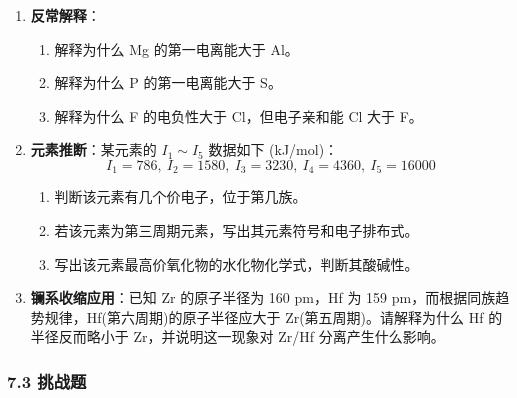 \begin{enumerate}
\def\labelenumi{\arabic{enumi}.}
\setcounter{enumi}{3}
\tightlist
\item
  \textbf{反常解释}：

  \begin{enumerate}
  \def\labelenumii{(\arabic{enumii})}
  \tightlist
  \item
    解释为什么 Mg 的第一电离能大于 Al。
  \item
    解释为什么 P 的第一电离能大于 S。
  \item
    解释为什么 F 的电负性大于 Cl，但电子亲和能 Cl 大于 F。
  \end{enumerate}
\item
  \textbf{元素推断}：某元素的 \(I_1\sim I_5\) 数据如下 (kJ/mol)：
  \[I_1=786,\ I_2=1580,\ I_3=3230,\ I_4=4360,\ I_5=16000\]

  \begin{enumerate}
  \def\labelenumii{(\arabic{enumii})}
  \tightlist
  \item
    判断该元素有几个价电子，位于第几族。
  \item
    若该元素为第三周期元素，写出其元素符号和电子排布式。
  \item
    写出该元素最高价氧化物的水化物化学式，判断其酸碱性。
  \end{enumerate}
\item
  \textbf{镧系收缩应用}：已知 Zr 的原子半径为 160 pm，Hf 为 159 pm，而根据同族趋势规律，Hf(第六周期)的原子半径应大于 Zr(第五周期)。请解释为什么 Hf 的半径反而略小于 Zr，并说明这一现象对 Zr/Hf 分离产生什么影响。
\end{enumerate}

\subsubsection{7.3 挑战题}\label{ux6311ux6218ux9898}

